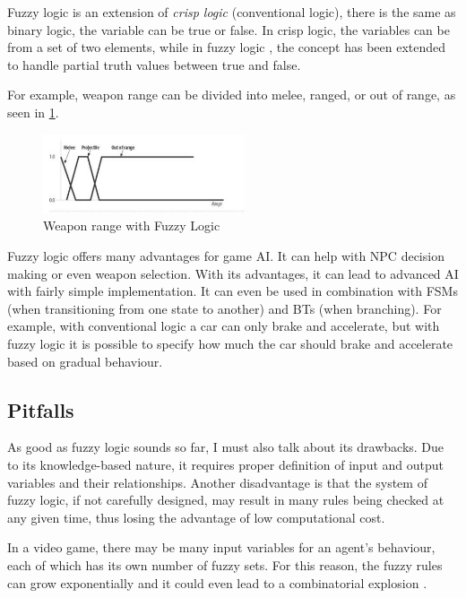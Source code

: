 \documentclass[a4paper,12pt,openright]{book}
\begin{document}
Fuzzy logic is an extension of \emph{crisp logic} (conventional logic), there is the same as binary logic, the variable can be true or false. In crisp logic, the variables can be from a set of two elements, while in fuzzy logic \cite{FuzzyLogicBasedGameSystem}, the concept has been extended to handle partial truth values between true and false. 

For example, weapon range can be divided into melee, ranged, or out of range, as seen in \ref{pic4}.

\begin{figure}[h]
\begin{center}
\includegraphics[width=0.53\textwidth]{Images/weapon_range.png}
\end{center}
\caption{Weapon range with Fuzzy Logic \cite{FuzzyAIGames}}
\label{pic4}
\end{figure}

Fuzzy logic offers many advantages for game AI. It can help with NPC decision making or even weapon selection. With its advantages, it can lead to advanced AI with fairly simple implementation. It can even be used in combination with FSMs (when transitioning from one state to another) and BTs (when branching). For example, with conventional logic a car can only brake and accelerate, but with fuzzy logic it is possible to specify how much the car should brake and accelerate based on gradual behaviour. 

\subsection{Pitfalls}

As good as fuzzy logic sounds so far, I must also talk about its drawbacks. Due to its knowledge-based nature, it requires proper definition of input and output variables and their relationships. Another disadvantage is that the system of fuzzy logic, if not carefully designed, may result in many rules being checked at any given time, thus losing the advantage of low computational cost.

In a video game, there may be many input variables for an agent's behaviour, each of which has its own number of fuzzy sets. For this reason, the fuzzy rules can grow exponentially and it could even lead to a combinatorial explosion \cite{CombinatorialBombing}.
\end{document}
